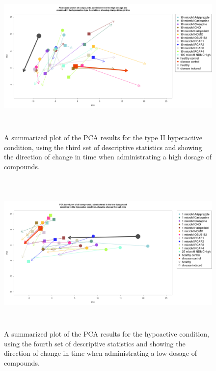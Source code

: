 \documentclass[a4paper,12pt]{article}
\begin{document}
\newpage
\begin{figure}[h!]
\begin{center}
\includegraphics[width=16cm,height=8cm]{All_together_10_microM_DarkPTZ_in_time_set3_NM.png}
\caption{A summarized plot of the PCA results for the type II hyperactive condition, using the third set of descriptive statistics and showing the direction of change in time when administrating a high dosage of compounds.}
\end{center}
\end{figure}
\newpage
\begin{figure}[h!]
\begin{center}
\includegraphics[width=16cm,height=8cm]{All_together_1_microM_DarkApoLow_in_time_set4.png}
\caption{A summarized plot of the PCA results for the hypoactive condition, using the fourth set of descriptive statistics and showing the direction of change in time when administrating a low dosage of compounds.}
\end{center}
\end{figure}
\end{document}
